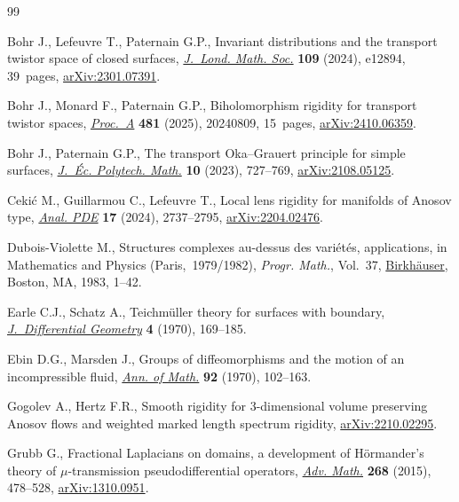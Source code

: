 \documentclass[pdftex]{sigma}
\numberwithin{equation}{section}
\theoremstyle{definition}
\newcommand{\1}{{\bf 1}}
\begin{document}
\begin{thebibliography}{99}
\footnotesize\itemsep=0pt

Bohr J., Lefeuvre T., Paternain G.P., Invariant distributions and the transport
 twistor space of closed surfaces,
 \href{https://doi.org/10.1112/jlms.12894}{\textit{J.~Lond. Math. Soc.}}
 \textbf{109} (2024), e12894, 39~pages,
 \href{http://arxiv.org/abs/2301.07391}{arXiv:2301.07391}.

Bohr J., Monard F., Paternain G.P., Biholomorphism rigidity for transport
 twistor spaces,
 \href{https://doi.org/10.1098/rspa.2024.0809}{\textit{Proc.~A}} \textbf{481}
 (2025), 20240809, 15~pages,
 \href{http://arxiv.org/abs/2410.06359}{arXiv:2410.06359}.

Bohr J., Paternain G.P., The transport {O}ka--{G}rauert principle for simple
 surfaces, \href{https://doi.org/10.5802/jep.231}{\textit{J.~\'{E}c. Polytech.
 Math.}} \textbf{10} (2023), 727--769,
 \href{http://arxiv.org/abs/2108.05125}{arXiv:2108.05125}.

Ceki\'c M., Guillarmou C., Lefeuvre T., Local lens rigidity for manifolds of
 {A}nosov type, \href{https://doi.org/10.2140/apde.2024.17.2737}{\textit{Anal.
 PDE}} \textbf{17} (2024), 2737--2795,
 \href{http://arxiv.org/abs/2204.02476}{arXiv:2204.02476}.

Dubois-Violette M., Structures complexes au-dessus des vari\'et\'es,
 applications, in Mathematics and {P}hysics ({P}aris,~1979/1982),
 \textit{Progr. Math.}, Vol.~37,
 \href{https://doi.org/10.1007/BF02591680}{Birkh\"auser}, Boston, MA, 1983,
 1--42.

Earle C.J., Schatz A., Teichm\"uller theory for surfaces with boundary,
 \href{https://doi.org/10.4310/jdg/1214429381}{\textit{J.~Differential
 Geometry}} \textbf{4} (1970), 169--185.

Ebin D.G., Marsden J., Groups of diffeomorphisms and the motion of an
 incompressible fluid, \href{https://doi.org/10.2307/1970699}{\textit{Ann. of
 Math.}} \textbf{92} (1970), 102--163.

Gogolev A., Hertz F.R., Smooth rigidity for 3-dimensional volume preserving
 {A}nosov flows and weighted marked length spectrum rigidity,
 \href{http://arxiv.org/abs/2210.02295}{arXiv:2210.02295}.

Grubb G., Fractional {L}aplacians on domains, a development of {H}\"ormander's
 theory of {$\mu$}-transmission pseudodifferential operators,
 \href{https://doi.org/10.1016/j.aim.2014.09.018}{\textit{Adv. Math.}}
 \textbf{268} (2015), 478--528,
 \href{http://arxiv.org/abs/1310.0951}{arXiv:1310.0951}.


\end{thebibliography}
\end{document}
